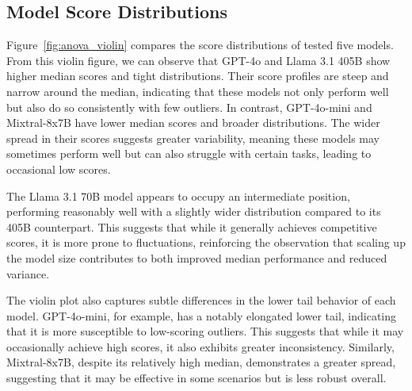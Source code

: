 

\subsection{Model Score Distributions}
Figure~\ref{fig:anova_violin} compares the score distributions of tested five models. From this violin figure, we can observe that GPT-4o and Llama 3.1 405B show higher median scores and tight distributions. Their score profiles are steep and narrow around the median, indicating that these models not only perform well but also do so consistently with few outliers. In contrast, GPT-4o-mini and Mixtral-8x7B have lower median scores and broader distributions. The wider spread in their scores suggests greater variability, meaning these models may sometimes perform well but can also struggle with certain tasks, leading to occasional low scores.

The Llama 3.1 70B model appears to occupy an intermediate position, performing reasonably well with a slightly wider distribution compared to its 405B counterpart. This suggests that while it generally achieves competitive scores, it is more prone to fluctuations, reinforcing the observation that scaling up the model size contributes to both improved median performance and reduced variance.

The violin plot also captures subtle differences in the lower tail behavior of each model. GPT-4o-mini, for example, has a notably elongated lower tail, indicating that it is more susceptible to low-scoring outliers. This suggests that while it may occasionally achieve high scores, it also exhibits greater inconsistency. Similarly, Mixtral-8x7B, despite its relatively high median, demonstrates a greater spread, suggesting that it may be effective in some scenarios but is less robust overall.

